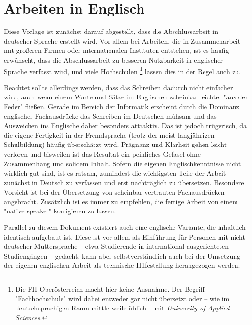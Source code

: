 \section{Arbeiten in Englisch}
\label{sec:englisch}

Diese Vorlage ist zunächst darauf abgestellt, dass die Abschlussarbeit in
deutscher Sprache erstellt wird. Vor allem bei Arbeiten, die in
Zusammenarbeit mit größeren Firmen oder internationalen Instituten entstehen,
ist es häufig erwünscht, dass die Abschlussarbeit zu besseren Nutzbarkeit in
englischer Sprache verfasst wird, und viele Hochschulen%
\footnote{Die FH Oberösterreich macht hier keine Ausnahme. Der Begriff
"Fachhochschule" wird dabei entweder gar nicht übersetzt oder -- wie im
deutschsprachigen Raum mittlerweile üblich -- mit \emph{University of Applied
Sciences}.}
lassen dies in der Regel auch zu.

Beachtet sollte allerdings werden, dass das Schreiben dadurch nicht einfacher
wird, auch wenn einem Worte und Sätze im Englischen scheinbar leichter "aus
der Feder" fließen. Gerade im Bereich der Informatik erscheint durch die
Dominanz englischer Fachausdrücke das Schreiben im Deutschen mühsam und das
Ausweichen ins Englische daher besonders attraktiv. Das ist jedoch
trügerisch, da die eigene Fertigkeit in der Fremdsprache (trotz der meist
langjährigen Schulbildung) häufig überschätzt wird. Prägnanz und Klarheit
gehen leicht verloren und bisweilen ist das Resultat ein peinliches Gefasel
ohne Zusammenhang und solidem Inhalt. Sofern die eigenen Englischkenntnisse
nicht wirklich gut sind, ist es ratsam, zumindest die wichtigsten Teile der
Arbeit zunächst in Deutsch zu verfassen und erst nachträglich zu übersetzen.
Besondere Vorsicht ist bei der Übersetzung von scheinbar vertrauten
Fachausdrücken angebracht. Zusätzlich ist es immer zu empfehlen, die fertige
Arbeit von einem "native speaker" korrigieren zu lassen.

Parallel zu diesem Dokument existiert auch eine englische Variante, die
inhaltlich identisch aufgebaut ist. Diese ist vor allem als Einführung für
Personen mit nicht-deutscher Muttersprache -- etwa Studierende in
international ausgerichteten Studiengängen -- gedacht, kann aber
selbstverständlich auch bei der Umsetzung der eigenen englischen Arbeit als
technische Hilfestellung herangezogen werden.

